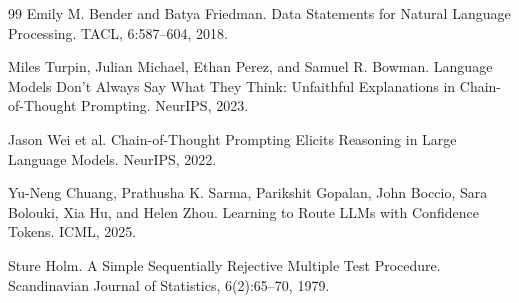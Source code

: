 \documentclass[11pt,a4paper]{ctexart}
\begin{document}
\begin{thebibliography}{99}
 Emily M. Bender and Batya Friedman. Data Statements for
Natural Language Processing. TACL, 6:587--604, 2018.

 Miles Turpin, Julian Michael, Ethan Perez, and Samuel R.
Bowman. Language Models Don't Always Say What They Think: Unfaithful
Explanations in Chain-of-Thought Prompting. NeurIPS, 2023.

 Jason Wei et al. Chain-of-Thought Prompting Elicits Reasoning
in Large Language Models. NeurIPS, 2022.

 Yu-Neng Chuang, Prathusha K. Sarma, Parikshit Gopalan,
John Boccio, Sara Bolouki, Xia Hu, and Helen Zhou. Learning to Route LLMs with
Confidence Tokens. ICML, 2025.

 Sture Holm. A Simple Sequentially Rejective Multiple Test
Procedure. Scandinavian Journal of Statistics, 6(2):65--70, 1979.

\end{thebibliography}
\end{document}
